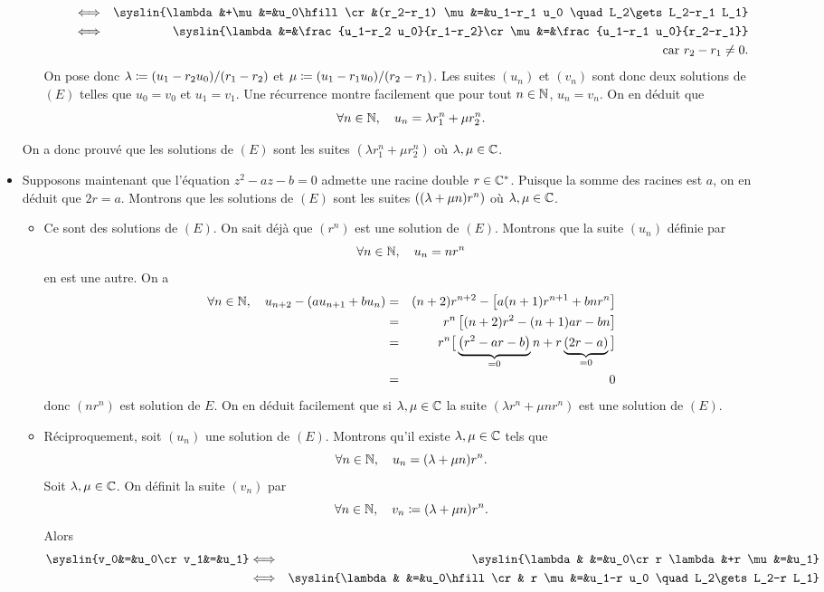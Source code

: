 \documentclass{magnoliaold}
\begin{document}
\begin{preuve}
\begin{itemize}
\begin{itemize}
\begin{eqnarray*}
&\ssi& \syslin{\lambda &+\mu&=&u_0\hfill\cr &(r_2-r_1) \mu&=&u_1-r_1 u_0 \quad L_2\gets L_2-r_1 L_1}\\
&\ssi& \syslin{\lambda&=&\frac{u_1-r_2 u_0}{r_1-r_2}\cr \mu&=&\frac{u_1-r_1 u_0}{r_2-r_1}}\\
&    & \text{car $r_2-r_1\neq 0$.}
\end{eqnarray*}
On pose donc $\lambda\coloneqq (u_1-r_2 u_0)/(r_1-r_2)$ et $\mu\coloneqq(u_1-r_1 u_0)/(r_2-r_1)$. Les suites $(u_n)$ et $(v_n)$ sont donc deux solutions de $(E)$ telles que $u_0=v_0$ et $u_1=v_1$. Une récurrence montre facilement que pour tout $n\in\mathbb{N}$, $u_n=v_n$. On en déduit que
\[\forall n\in\mathbb{N},\quad u_n=\lambda r_1^n+\mu r_2^n.\]
\end{itemize}
On a donc prouvé que les solutions de $(E)$ sont les suites $(\lambda r_1^n+\mu r_2^n)$ où $\lambda,\mu\in\mathbb{C}$.
\item Supposons maintenant que l'équation $z^2-az-b=0$ admette une racine double $r\in\mathbb{C}^*$. Puisque la somme des racines est $a$, on en déduit que $2r=a$. Montrons que les solutions de $(E)$ sont les suites $\left((\lambda+\mu n)r^n\right)$ où $\lambda,\mu\in\mathbb{C}$.
\begin{itemize}
\item Ce sont des solutions de $(E)$. On sait déjà que $(r^n)$ est une solution de $(E)$. Montrons que la suite $(u_n)$ définie par
\[\forall n\in\mathbb{N},\quad u_n=n r^n\]
en est une autre. On a
\begin{eqnarray*}
\forall n\in\mathbb{N},\quad u_{n+2}-\left(au_{n+1}+bu_n\right)
&=& (n+2)r^{n+2}-\left[a(n+1)r^{n+1}+b n r^n\right]\\
&=& r^n\left[(n+2)r^2-(n+1)ar-bn\right]\\
&=& r^n\big[\underbrace{\left(r^2-ar-b\right)}_{=0}n+r\underbrace{(2r-a)}_{=0}\big]\\
&=& 0
\end{eqnarray*}
donc $(n r^n)$ est solution de $E$. On en déduit facilement que si $\lambda,\mu\in\mathbb{C}$ la suite $(\lambda r^n + \mu n r^n)$ est une solution de $(E)$.
\item Réciproquement, soit $(u_n)$ une solution de $(E)$. Montrons qu'il existe $\lambda,\mu\in\mathbb{C}$ tels que
\[\forall n\in\mathbb{N},\quad u_n=(\lambda+\mu n)r^n.\]
Soit $\lambda,\mu\in\mathbb{C}$. On définit la suite $(v_n)$ par
\[\forall n\in\mathbb{N},\quad v_n\coloneqq(\lambda+\mu n)r^n.\]
Alors
\begin{eqnarray*}
\syslin{v_0&=&u_0\cr v_1&=&u_1}
&\ssi& \syslin{\lambda & &=&u_0\cr r \lambda&+r \mu&=&u_1}\\
&\ssi& \syslin{\lambda & &=&u_0\hfill\cr & r \mu&=&u_1-r u_0 \quad L_2\gets L_2-r L_1}\\

\end{eqnarray*}
\end{itemize}
\end{itemize}
\end{preuve}
\end{document}
